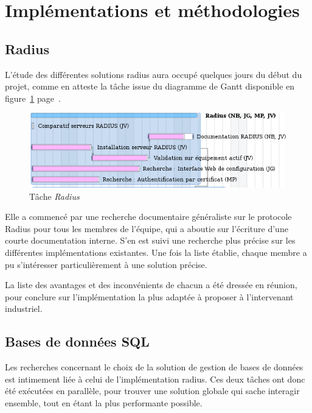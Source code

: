 \section{Implémentations et méthodologies}
\subsection{Radius}

L'étude des différentes solutions radius aura occupé quelques jours du début du projet, comme en atteste la tâche issue du diagramme de Gantt disponible en figure~\ref{gantt_radius} page~\pageref{gantt_radius}.

\begin{figure}[!h]
	\label{gantt_radius}
	\begin{center}
		\includegraphics[width=350pt]{img/gantt_radius.png}
	\end{center}
	\caption{Tâche \textit{Radius}}
\end{figure}

Elle a commencé par une recherche documentaire généraliste sur le protocole Radius pour tous les membres de l'équipe, qui a aboutie sur l'écriture d'une courte documentation interne. S'en est suivi une recherche plus précise sur les différentes implémentations existantes. Une fois la liste établie, chaque membre a pu s'intéresser particulièrement à une solution précise.

La liste des avantages et des inconvénients de chacun a été dressée en réunion, pour conclure sur l'implémentation la plus adaptée à proposer à l'intervenant industriel.

\subsection{Bases de données SQL}

Les recherches concernant le choix de la solution de gestion de bases de données est intimement liée à celui de l'implémentation radius. Ces deux tâches ont donc été exécutées en parallèle, pour trouver une solution globale qui sache interagir ensemble, tout en étant la plus performante possible.

